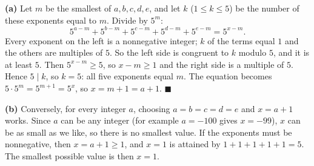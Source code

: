 \textbf{(a)} Let $m$ be the smallest of $a,b,c,d,e$, and let $k$ ($1\le k\le5$) be the number of these exponents equal to $m$. Divide by $5^m$:
\[
5^{a-m}+5^{b-m}+5^{c-m}+5^{d-m}+5^{e-m}=5^{x-m}.
\]
Every exponent on the left is a nonnegative integer; $k$ of the terms equal $1$ and the others are multiples of $5$. So the left side is congruent to $k$ modulo $5$, and it is at least $5$. Then $5^{x-m}\ge5$, so $x-m\ge1$ and the right side is a multiple of $5$. Hence $5\mid k$, so $k=5$: all five exponents equal $m$. The equation becomes $5\cdot5^m=5^{m+1}=5^x$, so $x=m+1=a+1$. $\blacksquare$

\textbf{(b)} Conversely, for every integer $a$, choosing $a=b=c=d=e$ and $x=a+1$ works. Since $a$ can be any integer (for example $a=-100$ gives $x=-99$), $x$ can be as small as we like, so there is no smallest value. If the exponents must be nonnegative, then $x=a+1\ge1$, and $x=1$ is attained by $1+1+1+1+1=5$. The smallest possible value is then $\boxed{x=1}$.
